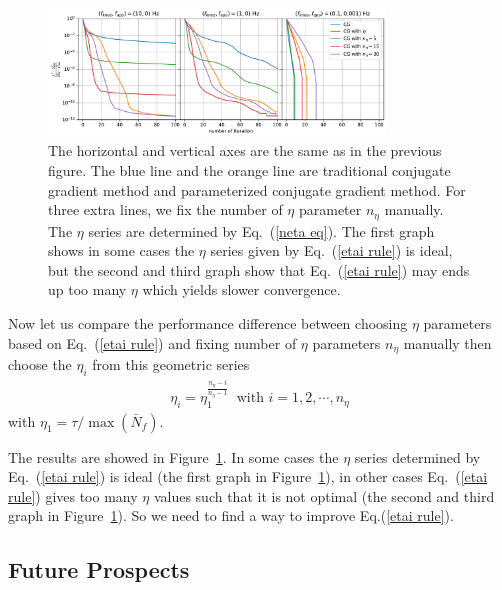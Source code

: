 \documentclass[twocolumn,linenumbers]{aastex631}
\newcommand{\Nbar}{\bar{N}}
\begin{document}
\begin{figure}[tb!]
\centering
\includegraphics[width=0.8\textwidth]{chi2_neta.pdf}
\caption{
    The horizontal and vertical axes are the same as in the previous figure.
    The blue line and the orange line are traditional conjugate gradient method
    and parameterized conjugate gradient method.
    For three extra lines, we fix the number of $\eta$ parameter $n_{\eta}$ manually.
    The $\eta$ series are determined by Eq.~(\ref{neta eq}).
    The first graph shows in some cases the $\eta$ series given by Eq.~(\ref{etai rule}) is ideal,
    but the second and third graph show that Eq.~(\ref{etai rule}) may ends up too many $\eta$
    which yields slower convergence.
}
\label{chi2 neta}
\end{figure}

Now let us compare the performance difference between choosing $\eta$
parameters based on Eq.~(\ref{etai rule})
and fixing number of $\eta$ parameters $n_{\eta}$ manually then
choose the $\eta_i$ from this geometric series
\begin{align}
\eta_i = \eta_1^{\frac{n_{\eta}-i}{n_{\eta} - 1}} \ \textrm{ with } i=1,2,\cdots,n_{\eta}
\label{neta eq}
\end{align}
with $\eta_1 = \tau/\max(\Nbar_f)$.

The results are showed in Figure~\ref{chi2 neta}.
In some cases the $\eta$ series determined by Eq.~(\ref{etai rule}) is ideal
(the first graph in Figure~\ref{chi2 neta}), in other cases Eq.~(\ref{etai rule})
gives too many $\eta$ values such that it is not optimal (the second and third
graph in Figure~\ref{chi2 neta}).
So we need to find a way to improve Eq.(\ref{etai rule}).



\subsection{Future Prospects}
\end{document}
